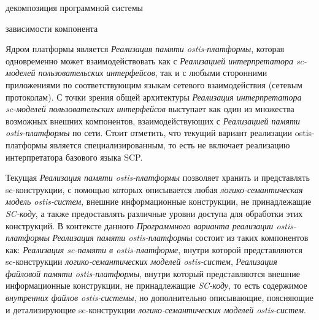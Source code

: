 \begin{SCn}
\begin{scnrelfromset}{декомпозиция программной системы}
\end{scnrelfromset}
\begin{scnrelfromset}{зависимости компонента}
\end{scnrelfromset}
\end{SCn}

Ядром платформы является \textit{Реализация памяти ostis-платформы}, которая одновременно может взаимодействовать как с \textit{Реализацией интерпретатора sc-моделей пользовательских интерфейсов}, так и с любыми сторонними приложениями по соответствующим языкам сетевого взаимодействия (сетевым протоколам). С точки зрения общей архитектуры \textit{Реализация интерпретатора sc-моделей пользовательских интерфейсов} выступает как один из множества возможных внешних компонентов, взаимодействующих с \textit{Реализацией памяти ostis-платформы} по сети. Стоит отметить, что текущий вариант реализации ostis-платформы является специализированным, то есть не включает реализацию интерпретатора базового языка SCP.

Текущая \textit{Реализация памяти ostis-платформы} позволяет хранить и представлять sc-конструкции, с помощью которых описывается любая \textit{логико-семантическая модель ostis-систем}, внешние информационные конструкции, не принадлежащие \textit{SC-коду}, а также предоставлять различные уровни доступа для обработки этих конструкций. В контексте данного \textit{Программного варианта реализации ostis-платформы} \textit{Реализация памяти ostis-платформы} состоит из таких компонентов как: \textit{Реализация sc-памяти в ostis-платформе}, внутри которой представляются sc-конструкции \textit{логико-семантических моделей ostis-систем}, \textit{Реализация файловой памяти ostis-платформы}, внутри который представляются внешние информационные конструкции, не принадлежащие \textit{SC-коду}, то есть содержимое \textit{внутренних файлов ostis-системы}, но дополнительно описывающие, поясняющие и детализирующие sc-конструкции \textit{логико-семантических моделей ostis-систем}.

